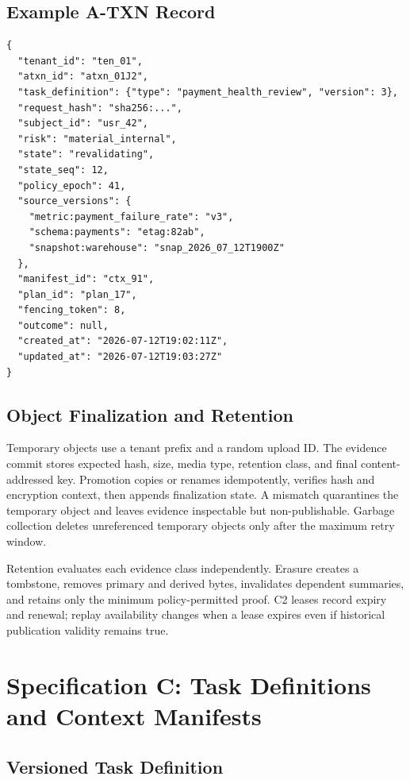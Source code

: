 \documentclass[10pt]{article}
\begin{document}
\Needspace{0.55\textheight}
\subsection{Example A-TXN Record}

\begin{lstlisting}[style=contract]
{
  "tenant_id": "ten_01",
  "atxn_id": "atxn_01J2",
  "task_definition": {"type": "payment_health_review", "version": 3},
  "request_hash": "sha256:...",
  "subject_id": "usr_42",
  "risk": "material_internal",
  "state": "revalidating",
  "state_seq": 12,
  "policy_epoch": 41,
  "source_versions": {
    "metric:payment_failure_rate": "v3",
    "schema:payments": "etag:82ab",
    "snapshot:warehouse": "snap_2026_07_12T1900Z"
  },
  "manifest_id": "ctx_91",
  "plan_id": "plan_17",
  "fencing_token": 8,
  "outcome": null,
  "created_at": "2026-07-12T19:02:11Z",
  "updated_at": "2026-07-12T19:03:27Z"
}
\end{lstlisting}

\subsection{Object Finalization and Retention}

Temporary objects use a tenant prefix and a random upload ID. The evidence commit stores expected hash, size, media type, retention class, and final content-addressed key. Promotion copies or renames idempotently, verifies hash and encryption context, then appends finalization state. A mismatch quarantines the temporary object and leaves evidence inspectable but non-publishable. Garbage collection deletes unreferenced temporary objects only after the maximum retry window.

Retention evaluates each evidence class independently. Erasure creates a tombstone, removes primary and derived bytes, invalidates dependent summaries, and retains only the minimum policy-permitted proof. C2 leases record expiry and renewal; replay availability changes when a lease expires even if historical publication validity remains true.

\Needspace{0.55\textheight}
\section{Specification C: Task Definitions and Context Manifests}

\subsection{Versioned Task Definition}
\end{document}
